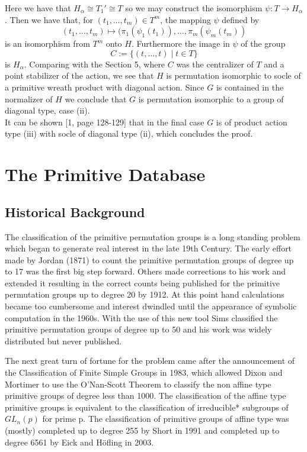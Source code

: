 \documentclass[]{article}
\theoremstyle{definition}
\begin{document}
Here we have that $H_\alpha \cong T_1' \cong T$ so we may construct the isomorphism $\psi:T \rightarrow H_\alpha$. Then we have that, for $(t_1,\dots,t_m) \in T^m$, the mapping $\psi$ defined by $$(t_1,\dots,t_m) \mapsto (\pi_1(\psi_1(t_1)),\dots,\pi_m(\psi_m(t_m))$$ is an isomorphism from $T^m$ onto $H$. Furthermore the image in $\psi$ of the group 
$$C:=\{(t,\dots,t) \; | \; t \in T \} $$
is $H_\alpha$. Comparing with the Section 5, where $C$ was the centralizer of $T$ and a point stabilizer of the action, we see that $H$ is permutation isomorphic to socle of a primitive wreath product with diagonal action. Since $G$ is contained in the normalizer of $H$ we conclude that $G$ is permutation isomorphic to a group of diagonal type, case (ii).\\ 

It can be shown [1, page 128-129] that in the final case $G$ is of product action type (iii) with socle of diagonal type (ii), which concludes the proof.

\clearpage
\section{The Primitive Database} 
\subsection{Historical Background}

The classification of the primitive permutation groups is a long standing problem which began to generate real interest in the late 19th Century. The early effort made by Jordan\cite{jordan} (1871) to count the primitive permutation groups of degree up to 17 was the first big step forward. Others made corrections to his work and extended it resulting in the correct counts being published for the primitive permutation groups up to degree 20 by 1912. At this point hand calculations became too cumbersome and interest dwindled until the appearance of symbolic computation in the 1960s. With the use of this new tool Sims\cite{sims} classified the primitive permutation groups of degree up to 50 and his work was widely distributed but never published.

The next great turn of fortune for the problem came after the announcement of the Classification of Finite Simple Groups in 1983, which allowed Dixon and Mortimer\cite{dm2} to use the O'Nan-Scott Theorem to classify the non affine type primitive groups of degree less than 1000. The classification of the affine type primitive groups is equivalent to the classification of irreducible* subgroups of $GL_n(p)$ for prime p. The classification of primitive groups of affine type was (mostly) completed up to degree 255 by Short\cite{short} in 1991 and completed up to degree 6561 by Eick and H\"{o}fling\cite{eick} in 2003.
\end{document}

